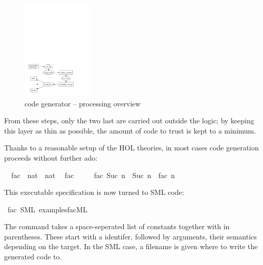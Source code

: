 \begin{isabellebody}
\begin{isamarkuptext}
\begin{itemize}
  \end{itemize}

  \begin{figure}[h]
  \centering
  \includegraphics[width=0.3\textwidth]{codegen_process}
  \caption{code generator -- processing overview}
  \label{fig:process}
  \end{figure}

  From these steps, only the two last are carried out
  outside the logic; by keeping this layer as
  thin as possible, the amount of code to trust is
  kept to a minimum.%
\end{isamarkuptext}%
\isamarkuptrue%
%
\isamarkuptrue%
%
\isamarkuptrue%
%
\begin{isamarkuptext}%
Thanks to a reasonable setup of the HOL theories, in
  most cases code generation proceeds without further ado:%
\end{isamarkuptext}%
\isamarkuptrue%
\isamarkupfalse%
\isanewline
\ \ fac\ {\isacharcolon}{\isacharcolon}\ {\isachardoublequoteopen}nat\ {\isasymRightarrow}\ nat{\isachardoublequoteclose}\isanewline
\isanewline
{}\isamarkupfalse%
\isanewline
\ \ {\isachardoublequoteopen}fac\ {}\ {\isacharequal}\ {}{\isachardoublequoteclose}\isanewline
\ \ {\isachardoublequoteopen}fac\ {\isacharparenleft}Suc\ n{\isacharparenright}\ {\isacharequal}\ Suc\ n\ {\isacharasterisk}\ fac\ n{\isachardoublequoteclose}%
\begin{isamarkuptext}%
This executable specification is now turned to SML code:%
\end{isamarkuptext}%
\isamarkuptrue%
\isamarkupfalse%
\ fac\ {\isacharparenleft}SML\ {\isachardoublequoteopen}examples{\isacharslash}fac{\isachardot}ML{\isachardoublequoteclose}{\isacharparenright}%
\begin{isamarkuptext}%
The \isasymCODEGEN command takes a space-seperated list of
  constants together with 
  in parentheses. These start with a 
  identifer, followed by arguments, their semantics
  depending on the target. In the SML case, a filename
  is given where to write the generated code to.


\end{isamarkuptext}
\end{isabellebody}
